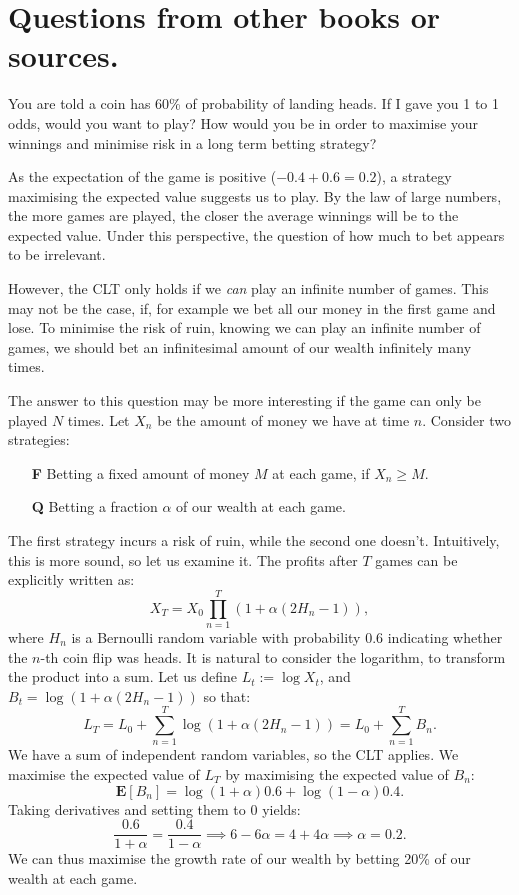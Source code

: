 \section{Questions from other books or sources.}

\begin{qanda}
  \Q You are told a coin has 60\% of probability of landing heads.
  If I gave you 1 to 1 odds, would you want to play? 
  How would you be in order to maximise your winnings and minimise risk in a long term betting strategy?

  \A
  As the expectation of the game is positive ($-0.4 + 0.6=0.2$), a strategy maximising the expected value suggests us to play.
  By the law of large numbers, the more games are played, the closer the average winnings will be to the expected value.
  Under this perspective, the question of how much to bet appears to be irrelevant.

  However, the CLT only holds if we \emph{can} play an infinite number of games.
  This may not be the case, if, for example we bet all our money in the first game and lose.
  To minimise the risk of ruin, knowing we can play an infinite number of games, we should bet an infinitesimal amount of our wealth infinitely many times.

  The answer to this question may be more interesting if the game can only be played $N$ times.
  Let $X_n$ be the amount of money we have at time $n$.
  Consider two strategies:
  \begin{itemize}
      \item[\textbf{F}] Betting a fixed amount of money $M$ at each game, if $X_n \geq M$.
      \item[\textbf{Q}] Betting a fraction $\alpha$ of our wealth at each game.
  \end{itemize}
  The first strategy incurs a risk of ruin, while the second one doesn't. Intuitively, this is more sound, so let us examine it.
  The profits after $T$ games can be explicitly written as:
  \[
      X_T = X_0 \prod_{n=1}^T (1 + \alpha(2H_{n} - 1)),
  \]
  where $H_n$ is a Bernoulli random variable with probability $0.6$ indicating whether the $n$-th coin flip was heads. 
  It is natural to consider the logarithm, to transform the product into a sum.
  Let us define $L_t := \log X_t$, and $B_t =\log(1 + \alpha(2H_{n} - 1)) $ so that:
  \[
  L_T = L_0 + \sum_{n=1}^T \log(1 + \alpha(2H_{n} - 1)) = L_0 + \sum_{n=1}^T B_n.
  \]
  We have a sum of independent random variables, so the CLT applies.
  We maximise the expected value of $L_T$ by maximising the expected value of $B_n$:
  \[
      \mathbf{E}[B_n] = \log(1 + \alpha) 0.6 + \log(1 - \alpha) 0.4. 
  \]
  Taking derivatives and setting them to 0 yields:
  \[
  \frac{0.6}{1+\alpha} = \frac{0.4}{1-\alpha} \implies
  6 - 6\alpha = 4 + 4\alpha \implies \alpha = 0.2.
  \]
  We can thus maximise the growth rate of our wealth by betting 20\% of our wealth at each game.
\end{qanda}
